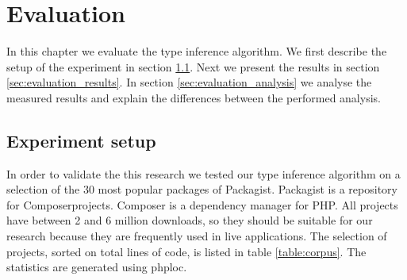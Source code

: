 \documentclass[../main.tex]{subfiles}
\begin{document}
    \chapter{Evaluation}\label{ch:evaluation}
	In this chapter we evaluate the type inference algorithm.
	We first describe the setup of the experiment in section \ref{sec:evaluation_experiment_setup}.
	Next we present the results in section \ref{sec:evaluation_results}.
	In section \ref{sec:evaluation_analysis} we analyse the measured results and explain the differences between the performed analysis.
	
	\section{Experiment setup}\label{sec:evaluation_experiment_setup}
	
	In order to validate the this research we tested our type inference algorithm on a selection of the 30 most popular packages of Packagist\footnotemark.
	Packagist is a repository for Composer\footnotemark projects.
	Composer is a dependency manager for PHP.
	All projects have between 2 and 6 million downloads, so they should be suitable for our research because they are frequently used in live applications.
	The selection of projects, sorted on total lines of code, is listed in table \ref{table:corpus}.
	The statistics are generated using phploc\footnotemark.
\end{document}
